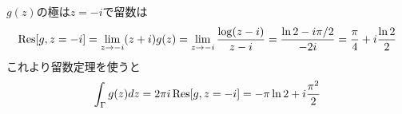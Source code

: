 \documentclass[../ap_2011.tex]{subfiles}
\begin{document}
\section{}
\(g(z)\)の極は\(z=-i\)で留数は
\begin{equation}\begin{aligned}[b]
    \Res[g,z=-i]=\lim_{z\to -i}(z+i)g(z)=\lim_{z\to-i}\frac{\log(z-i)}{z-i}=\frac{\ln2-i\pi/2}{-2i}=\frac{\pi}{4}+i\frac{\ln2}{2}
\end{aligned}\end{equation}
これより留数定理を使うと
\begin{equation}\begin{aligned}[b]
    \int_\Gamma g(z)dz = 2\pi i\Res[g,z=-i]=-\pi\ln 2+i\frac{\pi^2}{2}
\end{aligned}\end{equation}
\end{document}
